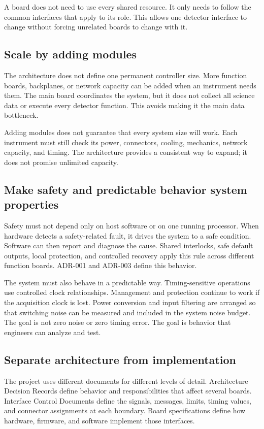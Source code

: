 A board does not need to use every shared resource. It only needs to follow the common interfaces that apply to its role. This allows one detector interface to change without forcing unrelated boards to change with it.

\subsection{Scale by adding modules}

The architecture does not define one permanent controller size. More function boards, backplanes, or network capacity can be added when an instrument needs them. The main board coordinates the system, but it does not collect all science data or execute every detector function. This avoids making it the main data bottleneck.

Adding modules does not guarantee that every system size will work. Each instrument must still check its power, connectors, cooling, mechanics, network capacity, and timing. The architecture provides a consistent way to expand; it does not promise unlimited capacity.

\subsection{Make safety and predictable behavior system properties}

Safety must not depend only on host software or on one running processor. When hardware detects a safety-related fault, it drives the system to a safe condition. Software can then report and diagnose the cause. Shared interlocks, safe default outputs, local protection, and controlled recovery apply this rule across different function boards. ADR-001 and ADR-003 define this behavior.

The system must also behave in a predictable way. Timing-sensitive operations use controlled clock relationships. Management and protection continue to work if the acquisition clock is lost. Power conversion and input filtering are arranged so that switching noise can be measured and included in the system noise budget. The goal is not zero noise or zero timing error. The goal is behavior that engineers can analyze and test.

\subsection{Separate architecture from implementation}

The project uses different documents for different levels of detail. Architecture Decision Records define behavior and responsibilities that affect several boards. Interface Control Documents define the signals, messages, limits, timing values, and connector assignments at each boundary. Board specifications define how hardware, firmware, and software implement those interfaces.

